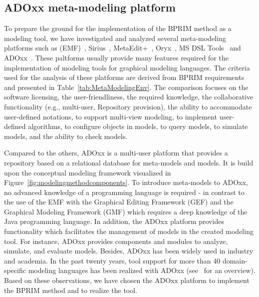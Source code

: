 \documentclass[preprint,3p,times,number]{elsarticle}
\begin{document}
\subsection{ADOxx meta-modeling platform} 
To prepare the ground for the implementation of the BPRIM method as a modeling tool, we have investigated and analyzed several meta-modeling platforms such as (EMF)~\cite{mcneill2008}, Sirius~\cite{Sirius2014}, MetaEdit+~\cite{tolvanen2003}, Oryx~\cite{decker_oryx_2008}, MS DSL Tools~\cite{MSDSLTool} and ADOxx~\cite{ADOxx}. These paltforms usually provide many features required for the implementation of modeling tools for graphical modeling languages. The criteria used for the analysis of these platforms are derived from BPRIM requirements and presented in Table~\ref{tab:MetaModelingEnv}. The comparison focuses on the software licensing, the user-friendliness, the required knowledge, the collaborative functionality (e.g., multi-user, Repository provision), the ability to accommodate user-defined notations, to support multi-view modeling, to implement user-defined algorithms, to configure objects in models, to query models, to simulate models, and the ability to check models.

Compared to the others, ADOxx is a multi-user platform that provides a repository based on a relational database for meta-models and models. It is build upon the conceptual modeling framework visualized in Figure~\ref{fig:modelingmethodcomponents}. To introduce meta-models to ADOxx, no advanced knowledge of a programming language is required - in contrast to the use of the EMF with the Graphical Editing Framework (GEF) and the Graphical Modeling Framework (GMF) which requires a deep knowledge of the Java programming language. In addition, the ADOxx platform provides functionality which facilitates the management of models in the created modeling tool. For instance, ADOxx provides components and modules to analyze, simulate, and evaluate models. Besides, ADOxx has been widely used in industry and academia. In the past twenty years, tool support for more than 40 domain-specific modeling languages has been realized with ADOxx (see~\cite{OMiLAB-Book.2016} for an overview). Based on these observations, we have chosen the ADOxx platform to implement the BPRIM method and to realize the \adobprim{} tool.
\end{document}
